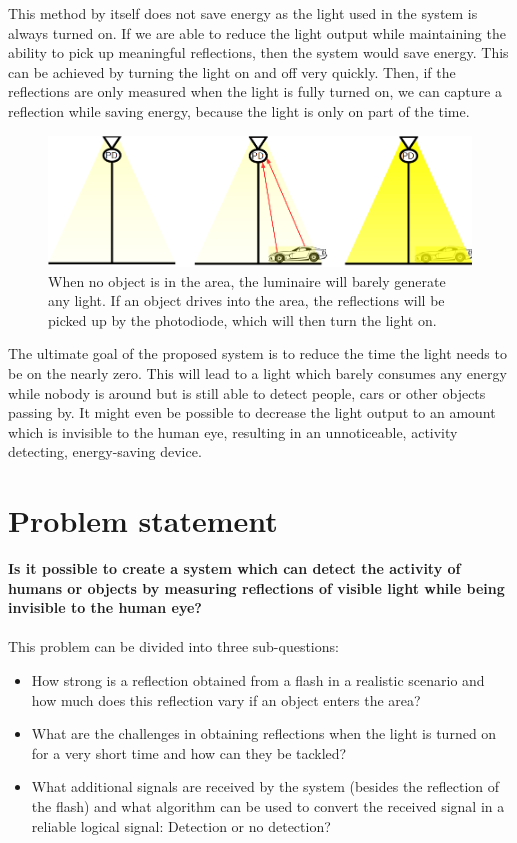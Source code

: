 This method by itself does not save energy as the light used in the system is always turned on. If we are able to reduce the light output while maintaining the ability to pick up meaningful reflections, then the system would save energy. This can be achieved by turning the light on and off very quickly. Then, if the reflections are only measured when the light is fully turned on, we can capture a reflection while saving energy, because the light is only on part of the time.
\begin{figure}[]
	\centering     %
	\includegraphics[width=120mm]{pics/SystemScenario.png}
	\caption{When no object is in the area, the luminaire will barely generate any light. If an object drives into the area, the reflections will be picked up by the photodiode, which will then turn the light on. \label{fig:Introduction}}
\end{figure}

The ultimate goal of the proposed system is to reduce the time the light needs to be on the nearly zero. This will lead to a light which barely consumes any energy while nobody is around but is still able to detect people, cars or other objects passing by. It might even be possible to decrease the light output to an amount which is invisible to the human eye, resulting in an unnoticeable, activity detecting, energy-saving device.

\section{Problem statement}
\label{Problem statement}
\textbf{Is it possible to create a system which can detect the activity of humans or objects by measuring reflections of visible light while being invisible to the human eye?}
\\
\\
This problem can be divided into three sub-questions:
\begin{itemize}\itemsep2pt
	\item How strong is a reflection obtained from a flash in a realistic scenario and how much does this reflection vary if an object enters the area?
	\item What are the challenges in obtaining reflections when the light is turned on for a very short time and how can they be tackled?
	\item What additional signals are received by the system (besides the reflection of the flash) and what algorithm can be used to convert the received signal in a reliable logical signal: Detection or no detection?
\end{itemize}

